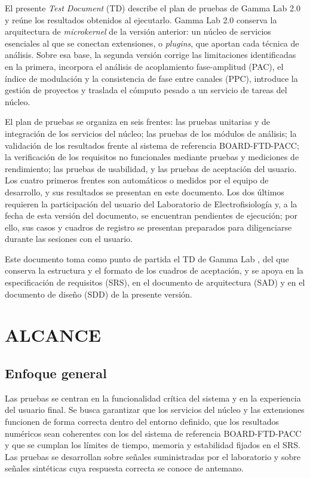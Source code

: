 \documentclass[12pt,letterpaper,oneside]{article}
\DeclareRobustCommand{\_}{\textunderscore\allowbreak}
\newcommand{\capitulo}[1]{\clearpage\section{#1}}
\begin{document}
El presente \textit{Test Document} (TD) describe el plan de pruebas de Gamma Lab 2.0 y reúne los resultados obtenidos al ejecutarlo. Gamma Lab 2.0 conserva la arquitectura de \textit{microkernel} de la versión anterior: un núcleo de servicios esenciales al que se conectan extensiones, o \textit{plugins}, que aportan cada técnica de análisis. Sobre esa base, la segunda versión corrige las limitaciones identificadas en la primera, incorpora el análisis de acoplamiento fase-amplitud (PAC), el índice de modulación y la consistencia de fase entre canales (PPC), introduce la gestión de proyectos y traslada el cómputo pesado a un servicio de tareas del núcleo.

El plan de pruebas se organiza en seis frentes: las pruebas unitarias y de integración de los servicios del núcleo; las pruebas de los módulos de análisis; la validación de los resultados frente al sistema de referencia BOARD-FTD-PACC; la verificación de los requisitos no funcionales mediante pruebas y mediciones de rendimiento; las pruebas de usabilidad, y las pruebas de aceptación del usuario. Los cuatro primeros frentes son automáticos o medidos por el equipo de desarrollo, y sus resultados se presentan en este documento. Los dos últimos requieren la participación del usuario del Laboratorio de Electrofisiología y, a la fecha de esta versión del documento, se encuentran pendientes de ejecución; por ello, sus casos y cuadros de registro se presentan preparados para diligenciarse durante las sesiones con el usuario.

Este documento toma como punto de partida el TD de Gamma Lab \cite{td2025}, del que conserva la estructura y el formato de los cuadros de aceptación, y se apoya en la especificación de requisitos (SRS), en el documento de arquitectura (SAD) y en el documento de diseño (SDD) de la presente versión.

\capitulo{ALCANCE}

\subsection{Enfoque general}
Las pruebas se centran en la funcionalidad crítica del sistema y en la experiencia del usuario final. Se busca garantizar que los servicios del núcleo y las extensiones funcionen de forma correcta dentro del entorno definido, que los resultados numéricos sean coherentes con los del sistema de referencia BOARD-FTD-PACC y que se cumplan los límites de tiempo, memoria y estabilidad fijados en el SRS. Las pruebas se desarrollan sobre señales suministradas por el laboratorio y sobre señales sintéticas cuya respuesta correcta se conoce de antemano.
\end{document}
